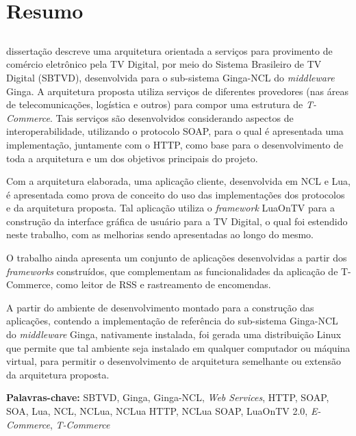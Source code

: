\chapter{Resumo}

\section*{\MyTitle} %

 dissertação descreve uma arquitetura orientada a serviços para provimento de comércio eletrônico
pela TV Digital, por meio do Sistema Brasileiro de TV Digital (SBTVD),
desenvolvida para o sub-sistema Ginga-NCL do \textit{middleware} Ginga.
A arquitetura proposta utiliza serviços de diferentes provedores (nas áreas de telecomunicações, logística e outros) para compor 
uma estrutura de \textit{T-Commerce}. Tais serviços são desenvolvidos
considerando aspectos de interoperabilidade, utilizando o protocolo SOAP,
para o qual é apresentada uma implementação, juntamente com o
HTTP, como base para o desenvolvimento de toda
a arquitetura e um dos objetivos principais do projeto.

Com a arquitetura elaborada, uma aplicação cliente, desenvolvida
em NCL e Lua, é apresentada como prova de conceito do uso das
implementações dos protocolos e da arquitetura proposta.
Tal aplicação utiliza o \textit{framework} LuaOnTV para a construção
da interface gráfica de usuário para a TV Digital, o qual foi estendido
neste trabalho, com as melhorias sendo apresentadas ao longo do mesmo.

O trabalho ainda apresenta um conjunto de aplicações desenvolvidas a partir
dos \textit{frameworks} construídos, que complementam as funcionalidades da aplicação
de T-Commerce, como leitor de RSS e rastreamento de encomendas.

A partir do ambiente de desenvolvimento montado para a construção das aplicações, 
contendo a implementação de referência do sub-sistema Ginga-NCL do \textit{middleware} Ginga, 
nativamente instalada, foi gerada uma distribuição Linux que permite que tal ambiente
seja instalado em qualquer computador ou máquina virtual, para permitir o desenvolvimento
de arquitetura semelhante ou extensão da arquitetura proposta.



\textbf{Palavras-chave:} SBTVD, Ginga, Ginga-NCL, \textit{Web Services}, HTTP, SOAP, SOA, Lua, NCL, NCLua, NCLua HTTP, NCLua SOAP, LuaOnTV 2.0, 
\textit{E-Commerce}, \textit{T-Commerce}

